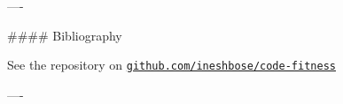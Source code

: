 \documentclass[]{beamer}
\renewcommand{\bibfont}{\small}
\begin{document}
\begin{frame}[fragile]
\begin{columns}[T]
\begin{column}{.48\textwidth}
\begin{markdown}
----










#### Bibliography


\renewcommand*{\bibfont}{\scriptsize}


\vspace{0.2cm}

{\footnotesize See the repository on \texttt{\scriptsize \href{https://github.com/ineshbose/code-fitness}{github.com/ineshbose/code-fitness}}}

----

\end{markdown}
\end{column}
\end{columns}
\end{frame}
\end{document}
